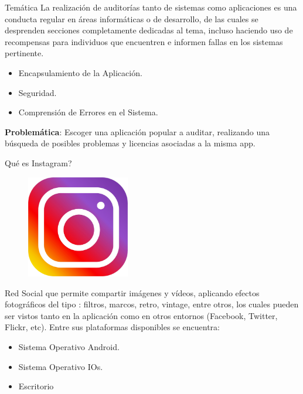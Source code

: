 
\begin{frame}[t,plain]
\titlepage
\end{frame}

\begin{frame}[t]{Temática}
La realización de auditorías tanto de sistemas como aplicaciones es una conducta regular en áreas informáticas o de desarrollo, de las cuales se desprenden secciones completamente dedicadas al tema, incluso haciendo uso de recompensas para individuos que encuentren e informen fallas en los sistemas pertinente. 

\begin{itemize}
\item Encapsulamiento de la Aplicación.
\item Seguridad.
\item Comprensión de Errores en el Sistema.
\end{itemize}

\bigskip
\textbf{Problemática}: Escoger una aplicación popular a auditar, realizando una búsqueda de posibles problemas y licencias asociadas a la misma app.
\bigskip

\end{frame}

\begin{frame}[t,fragile]{Qu\'e es Instagram?}
\begin{figure} 
\vspace{2pt}
  \begin{center}
    \includegraphics[width=0.4\textwidth]{ig}
    \label{fig:databaseUserTable}
  \end{center}
  \vspace{2pt}
\end{figure} 

Red Social que permite compartir imágenes y vídeos, aplicando efectos fotográficos del tipo : filtros, marcos, retro, vintage, entre otros, los cuales pueden ser vistos tanto en la aplicación como en otros entornos (Facebook, Twitter, Flickr, etc). 
Entre sus plataformas disponibles se encuentra:
\begin{center}
    \begin{itemize}
        \item Sistema Operativo Android.
        \item Sistema Operativo IOs.
        \item Escritorio
    \end{itemize}
\end{center}

\end{frame}

